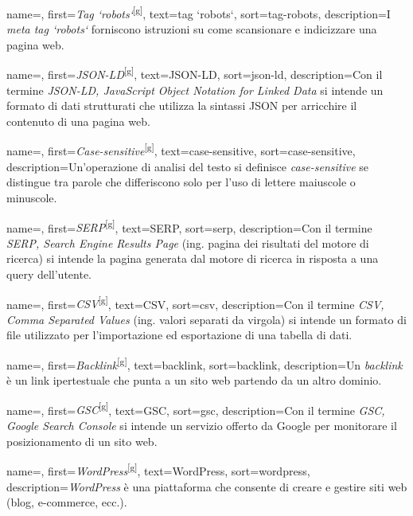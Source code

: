  {
    name=,
    first={\textit{Tag `robots`}\textsuperscript{[g]}},
    text=tag `robots`,
    sort=tag-robots,
    description={I \emph{meta tag `robots`} forniscono istruzioni su come scansionare e indicizzare una pagina web.}
}

 {
    name=,
    first={\textit{JSON-LD}\textsuperscript{[g]}},
    text=JSON-LD,
    sort=json-ld,
    description={Con il termine \emph{JSON-LD, JavaScript Object Notation for Linked Data} si intende un formato di dati strutturati che utilizza la sintassi JSON per arricchire il contenuto di una pagina web.}
}

 {
    name=,
    first={\textit{Case-sensitive}\textsuperscript{[g]}},
    text=case-sensitive,
    sort=case-sensitive,
    description={Un'operazione di analisi del testo si definisce \emph{case-sensitive} se distingue tra parole che differiscono solo per l'uso di lettere maiuscole o minuscole.}
}

 {
    name=,
    first={\textit{SERP}\textsuperscript{[g]}},
    text=SERP,
    sort=serp,
    description={Con il termine \emph{SERP, Search Engine Results Page} (ing. pagina dei risultati del motore di ricerca) si intende la pagina generata dal motore di ricerca in risposta a una query dell'utente.}
}

 {
    name=,
    first={\textit{CSV}\textsuperscript{[g]}},
    text=CSV,
    sort=csv,
    description={Con il termine \emph{CSV, Comma Separated Values} (ing. valori separati da virgola) si intende un formato di file utilizzato per l'importazione ed esportazione di una tabella di dati.}
}

 {
    name=,
    first={\textit{Backlink}\textsuperscript{[g]}},
    text=backlink,
    sort=backlink,
    description={Un \emph{backlink} è un link ipertestuale che punta a un sito web partendo da un altro dominio.}
}

 {
    name=,
    first={\textit{GSC}\textsuperscript{[g]}},
    text=GSC,
    sort=gsc,
    description={Con il termine \emph{GSC, Google Search Console} si intende un servizio offerto da Google per monitorare il posizionamento di un sito web.}
}

 {
    name=,
    first={\textit{WordPress}\textsuperscript{[g]}},
    text=WordPress,
    sort=wordpress,
    description={\emph{WordPress} è una piattaforma che consente di creare e gestire siti web (blog, e-commerce, ecc.).}
}

